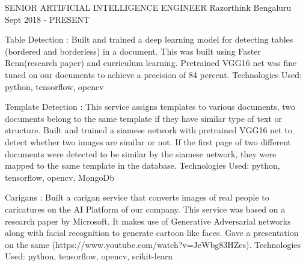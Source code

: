 
\begin{cventries}

  \cventry
    {SENIOR ARTIFICIAL INTELLIGENCE ENGINEER} %
    {Razorthink} %
    {Bengaluru} %
    {Sept 2018 - PRESENT} %
    {
      \begin{cvitems} %
        \item{Table Detection : Built and trained a deep learning model for detecting tables (bordered and borderless) in a document. This was built using Faster Rcnn(research paper) and curriculum learning. Pretrained VGG16 net was fine tuned on our documents to achieve a precision of 84 percent.  Technologies Used: python, tensorflow, opencv}        
        \item{Template Detection : This service assigns templates to various documents, two documents belong to the same template if they have similar type of text or structure. Built and trained a siamese network with pretrained VGG16 net to detect whether two images are similar or not. If the first page of two different documents were detected to be similar by the siamese network, they were mapped to the same template in the database. Technologies Used: python, tensorflow, opencv, MongoDb}        
        \item{Carigans : Built a carigan service that converts images of real people to caricatures on the AI Platform of our company. This service was based on a research paper by Microsoft. It makes use of Generative Adversarial networks along with facial recognition to generate cartoon like faces. Gave a presentation on the same (https://www.youtube.com/watch?v=JeWbg83HZes). Technologies Used: python, tensorflow, opencv, scikit-learn}     
	\end{cvitems}
    }


\end{cventries}
